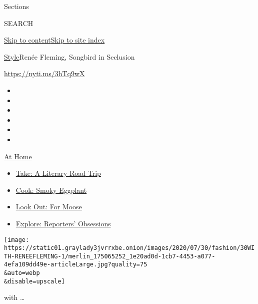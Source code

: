Sections

SEARCH

\protect\hyperlink{site-content}{Skip to
content}\protect\hyperlink{site-index}{Skip to site index}

\href{/section/style}{Style}\textbar{}Renée Fleming, Songbird in
Seclusion

\href{https://nyti.ms/3hTq9wX}{https://nyti.ms/3hTq9wX}

\begin{itemize}
\item
\item
\item
\item
\item
\item
\end{itemize}

\href{https://www.nytimes3xbfgragh.onion/spotlight/at-home?action=click\&pgtype=Article\&state=default\&region=TOP_BANNER\&context=at_home_menu}{At
Home}

\begin{itemize}
\tightlist
\item
  \href{https://www.nytimes3xbfgragh.onion/2020/07/28/books/time-for-a-literary-road-trip.html?action=click\&pgtype=Article\&state=default\&region=TOP_BANNER\&context=at_home_menu}{Take:
  A Literary Road Trip}
\item
  \href{https://www.nytimes3xbfgragh.onion/2020/07/29/magazine/bored-with-your-home-cooking-some-smoky-eggplant-will-fix-that.html?action=click\&pgtype=Article\&state=default\&region=TOP_BANNER\&context=at_home_menu}{Cook:
  Smoky Eggplant}
\item
  \href{https://www.nytimes3xbfgragh.onion/2020/07/27/travel/moose-michigan-isle-royale.html?action=click\&pgtype=Article\&state=default\&region=TOP_BANNER\&context=at_home_menu}{Look
  Out: For Moose}
\item
  \href{https://www.nytimes3xbfgragh.onion/interactive/2020/at-home/even-more-reporters-editors-diaries-lists-recommendations.html?action=click\&pgtype=Article\&state=default\&region=TOP_BANNER\&context=at_home_menu}{Explore:
  Reporters' Obsessions}
\end{itemize}

\texttt{[image: https://static01.graylady3jvrrxbe.onion/images/2020/07/30/fashion/30WITH-RENEEFLEMING-1/merlin\_175065252\_1e20ad0d-1cb7-4453-a077-4efa109dd49e-articleLarge.jpg?quality=75\\\&auto=webp\\\&disable=upscale]}

with \ldots{}

